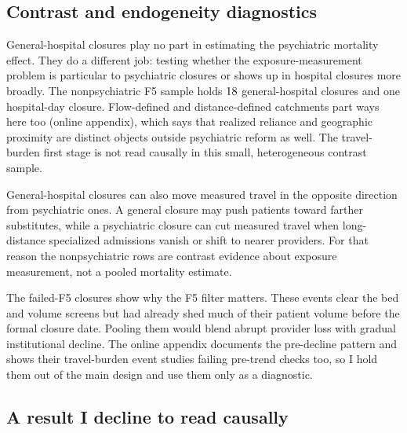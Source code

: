 \subsection{Contrast and endogeneity diagnostics}
\label{sec:results-contrast-diagnostics}

General-hospital closures play no part in estimating the psychiatric
mortality effect. They do a different job: testing whether the
exposure-measurement problem is particular to psychiatric closures or
shows up in hospital closures more broadly. The nonpsychiatric F5 sample
holds $18$ general-hospital closures and one hospital-day
closure. Flow-defined and distance-defined catchments part ways here too
(online appendix), which says that realized reliance and geographic
proximity are distinct objects outside psychiatric reform as well. The
travel-burden first stage is not read causally in this small,
heterogeneous contrast sample.

General-hospital closures can also move measured travel in the opposite
direction from psychiatric ones. A general closure may push patients
toward farther substitutes, while a psychiatric closure can cut measured
travel when long-distance specialized admissions vanish or shift to
nearer providers. For that reason the nonpsychiatric rows are contrast
evidence about exposure measurement, not a pooled mortality estimate.

The failed-F5 closures show why the F5 filter matters. These events clear
the bed and volume screens but had already shed much of their patient
volume before the formal closure date. Pooling them would blend abrupt
provider loss with gradual institutional decline. The online appendix
documents the pre-decline pattern and shows their travel-burden event
studies failing pre-trend checks too, so I hold them out of the main
design and use them only as a diagnostic.

\subsection{A result I decline to read causally}
\label{sec:results-icsap}

